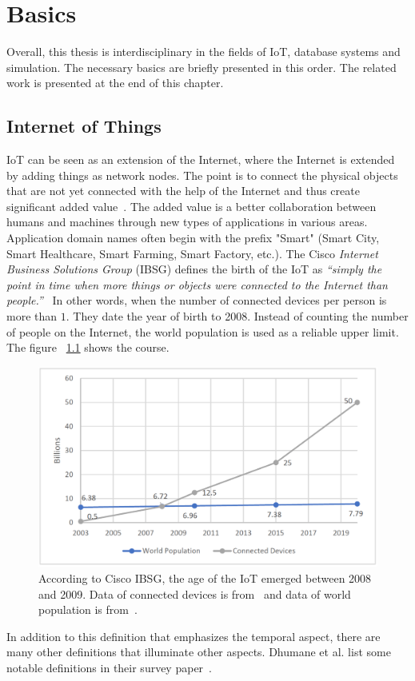 \documentclass[english,version-2019-11]{uzl-thesis}
\begin{document}
\chapter{Basics}
\label{chapter_Basics}
Overall, this thesis is interdisciplinary in the fields of IoT, database systems and simulation. The necessary basics are briefly presented in this order. The related work is presented at the end of this chapter.

\section{Internet of Things}
IoT can be seen as an extension of the Internet, where
the Internet is extended by adding things as network
nodes. The point is to connect the physical objects
that are not yet connected with the help of the Internet
and thus create significant added value~\cite{BookCisco}. The added
value is a better collaboration between
humans and machines through new types of applications
in various areas. Application domain names often
begin with the prefix "Smart" (Smart City, Smart Healthcare,
Smart Farming, Smart Factory, etc.).
The Cisco \emph{Internet Business Solutions Group} (IBSG)
defines the birth of the IoT as 
\emph{\enquote{simply the point in time when more things or
objects were connected to the Internet than people.}}~\cite{IoTEvolution}
In other words, when the number of connected devices
per person is more than $1$. They date the year
of birth to 2008.
Instead of counting the number of people on the Internet,
the world population is used as a reliable upper limit.
The figure ~\ref{figure_iot_birth} shows the course.
\begin{figure}[htpb]
  \centering
  \includegraphics[scale=0.4]{figure_iot_birth.pdf}
  \caption{According to Cisco IBSG, the age of the IoT emerged between 2008 and 2009. Data of connected devices is from~\cite{IoTEvolution} and data of world population is from~\cite{WorldPopulation}.}
  \label{figure_iot_birth}
\end{figure}
In addition to this definition that emphasizes
the temporal aspect, there are many other
definitions that illuminate other aspects.
Dhumane et al. list some notable definitions in their survey paper~\cite{RoutingIssuesSurvey}.
\end{document}
